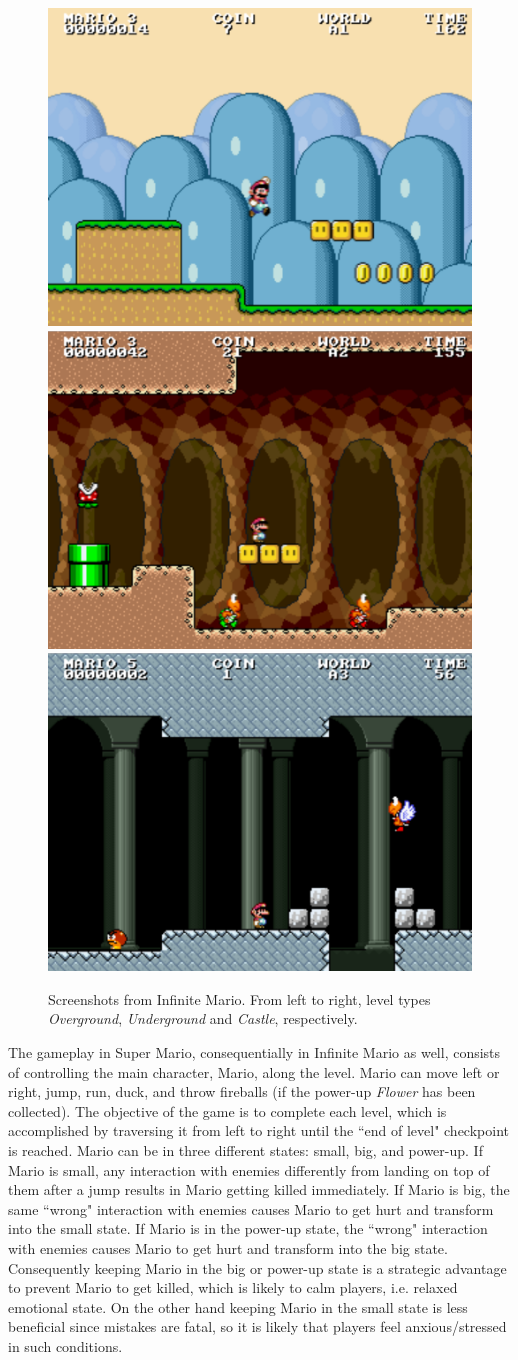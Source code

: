 \begin{figure}[h]
  \centering
  \includegraphics[width=.32\textwidth]{figures/mario-overground}\hfill
  \includegraphics[width=.32\textwidth]{figures/mario-underground}\hfill
  \includegraphics[width=.32\textwidth]{figures/mario-castle}
  \caption{Screenshots from Infinite Mario. From left to right, level types \textit{Overground}, \textit{Underground} and \textit{Castle}, respectively.}
  \label{fig:experiment2-infinite-mario}
\end{figure}

The gameplay in Super Mario, consequentially in Infinite Mario as well, consists of controlling the main character, Mario, along the level. Mario can move left or right, jump, run, duck, and throw fireballs (if the power-up \textit{Flower} has been collected). The objective of the game is to complete each level, which is accomplished by traversing it from left to right until the ``end of level" checkpoint is reached. Mario can be in three different states: small, big, and power-up. If Mario is small, any interaction with enemies differently from landing on top of them after a jump results in Mario getting killed immediately. If Mario is big, the same ``wrong" interaction with enemies causes Mario to get hurt and transform into the small state. If Mario is in the power-up state, the ``wrong" interaction with enemies causes Mario to get hurt and transform into the big state. Consequently keeping Mario in the big or power-up state is a strategic advantage to prevent Mario to get killed, which is likely to calm players, i.e. relaxed emotional state. On the other hand keeping Mario in the small state is less beneficial since mistakes are fatal, so it is likely that players feel anxious/stressed in such conditions.

